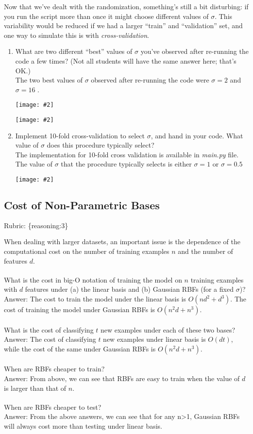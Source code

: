 \documentclass{article}
\def\rubric#1{\gre{Rubric: \{#1\}}}{}
\def\blu#1{{\color{blu}#1}}
\def\gre#1{{\color{gre}#1}}
\newcommand{\centerfig}[2]{\begin{center}\texttt{[image: \#2]}\end{center}}
\def\enum#1{\begin{enumerate}#1\end{enumerate}}
\begin{document}
Now that we've dealt with the randomization, something's still a bit disturbing:
if you run the script more than once it might choose different values of $\sigma$.
This variability would be reduced if we
had a larger ``train'' and ``validation'' set, and one way to simulate this is
with \emph{cross-validation}. 

\enum{
\item What are two different ``best'' values of $\sigma$ you've observed after re-running the code a few times? (Not all students will have the same answer here; that's OK.) \\
\newline \blu{Answer:} The two best values of $\sigma$ observed after re-running the code were $\sigma = 2$ and $\sigma =16$ .
\centerfig{.7}{../figs/least_squares_rbf_good3.pdf}
\centerfig{.7}{../figs/least_squares_rbf_good2.pdf}
\item Implement 10-fold cross-validation to select $\sigma$, and hand in your code. What value of $\sigma$ does this procedure typically select? \\
\newline \blu{Answer:} The implementation for 10-fold cross validation is available in \emph {main.py} file. The value of $\sigma$ that  the procedure typically selects is either $\sigma = 1$ or $\sigma = 0.5$
\centerfig{.7}{../figs/least_squares_rbf_10_fold.pdf}
}


\subsection{Cost of Non-Parametric Bases}
\rubric{reasoning:3}

When dealing with larger datasets, an important issue is the dependence of the
computational cost on the number of training examples $n$ and the number of
features $d$. \\ \\
What is the cost in big-O notation of training the model on $n$ training examples with $d$ features under (a) the linear basis and (b) Gaussian RBFs (for a fixed $\sigma$)? \\
\blu{Answer:} The cost to train the model under the linear basis is $O(nd^2 + d^3)$. The cost of training the model under Gaussian RBFs is $O(n^2d + n^3)$. \\ \\
What is the cost of classifying $t$ new examples under each of these two bases? \\
\blu{Answer:} The cost of classifying $t$ new examples under linear basis is $O(dt)$, while the cost of the same under Gaussian RBFs is $O(n^2d + n^3)$. \\ \\
When are RBFs cheaper to train? \\
\blu{Answer:} From above, we can see that RBFs are easy to train when the value of $d$ is larger than that of $n$. \\ \\
When are RBFs cheaper to test? \\
\blu{Answer:} From the above answers, we can see that for any n>1, Gaussian RBFs will always cost more than testing under linear basis.
\end{document}
